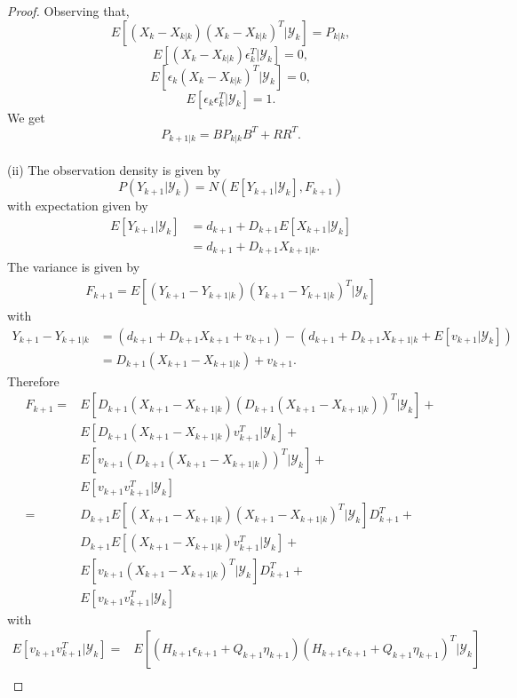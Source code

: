 \documentclass{article}
\theoremstyle{definition}
\theoremstyle{remark}
\newcommand{\filtrationObs}[1]{\ensuremath{\mathscr{Y}_{#1}}}
\begin{document}
\begin{proof}
Observing that, $$E[(X_k-X_{k|k})(X_k-X_{k|k})^T|\filtrationObs{k}]=P_{k|k},$$ 
$$E[(X_k-X_{k|k})\epsilon_k^T|\filtrationObs{k}]=0,$$
$$E[\epsilon_k(X_k-X_{k|k})^T|\filtrationObs{k}]=0,$$
$$E[\epsilon_k\epsilon_k^T|\filtrationObs{k}]=1.$$
We get
\begin{equation*}
P_{k+1|k}=BP_{k|k}B^T+RR^T.
\end{equation*}
\\
(ii) The observation density is given by
$$P(Y_{k+1}|\filtrationObs{k})=N(E[Y_{k+1}|\filtrationObs{k}],F_{k+1})$$
with expectation given by
\begin{align*}
E[Y_{k+1}|\filtrationObs{k}]&=d_{k+1}+D_{k+1}E[X_{k+1}|\filtrationObs{k}]\\
&=d_{k+1}+D_{k+1}X_{k+1|k}.
\end{align*}
The variance is given by
\begin{align*}
F_{k+1}=E[(Y_{k+1}-Y_{k+1|k})(Y_{k+1}-Y_{k+1|k})^T|\filtrationObs{k}]
\end{align*}
with 
\begin{align*}
Y_{k+1}-Y_{k+1|k}&=(d_{k+1}+D_{k+1}X_{k+1}+v_{k+1})-(d_{k+1}+D_{k+1}X_{k+1|k}+E[v_{k+1}|\filtrationObs{k}])\\
&=D_{k+1}(X_{k+1}-X_{k+1|k})+v_{k+1}.
\end{align*}
Therefore
\begin{align*}
F_{k+1}=&E[D_{k+1}(X_{k+1}-X_{k+1|k})(D_{k+1}(X_{k+1}-X_{k+1|k}))^T|\filtrationObs{k}]+\\
&E[D_{k+1}(X_{k+1}-X_{k+1|k})v_{k+1}^T|\filtrationObs{k}]+\\
&E[v_{k+1}(D_{k+1}(X_{k+1}-X_{k+1|k}))^T|\filtrationObs{k}]+\\
&E[v_{k+1}v_{k+1}^T|\filtrationObs{k}]\\
%
=&D_{k+1}E[(X_{k+1}-X_{k+1|k})(X_{k+1}-X_{k+1|k})^T|\filtrationObs{k}]D_{k+1}^T+\\
&D_{k+1}E[(X_{k+1}-X_{k+1|k})v_{k+1}^T|\filtrationObs{k}]+\\
&E[v_{k+1}(X_{k+1}-X_{k+1|k})^T|\filtrationObs{k}]D_{k+1}^T+\\
&E[v_{k+1}v_{k+1}^T|\filtrationObs{k}]
\end{align*}
with
\begin{align*}
E[v_{k+1}v_{k+1}^T|\filtrationObs{k}]=&E[(H_{k+1}\epsilon_{k+1}+Q_{k+1}\eta_{k+1})(H_{k+1}\epsilon_{k+1}+Q_{k+1}\eta_{k+1})^T|\filtrationObs{k}]\\

\end{align*}
\end{proof}
\end{document}
